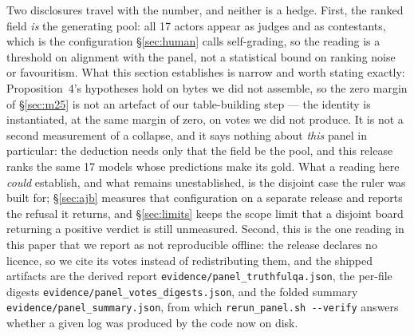 \documentclass{article}
\newcommand{\ids}[1]{\texttt{\small #1}} %
\begin{document}
Two disclosures travel with the number, and neither is a hedge. First, the ranked field \emph{is} the
generating pool: all 17 actors appear as judges and as contestants, which is the configuration \S\ref{sec:human}
calls self-grading, so the reading is a threshold on alignment with the panel, not a statistical bound on ranking noise or favouritism.
What this section establishes is narrow and worth stating exactly: Proposition~4's hypotheses hold on bytes we
did not assemble, so the zero margin of \S\ref{sec:m25} is not an artefact of our table-building step --- the
identity is instantiated, at the same margin of zero, on votes we did not produce. It is not a second
measurement of a collapse, and it says nothing about \emph{this} panel in particular: the deduction needs only
that the field be the pool, and this release ranks the same 17 models whose predictions make its gold. What a
reading here \emph{could} establish, and what remains unestablished, is the disjoint case the ruler was built
for; \S\ref{sec:ajb} measures that configuration on a separate release and reports the refusal it returns, and
\S\ref{sec:limits} keeps the scope limit that a disjoint board returning a positive verdict is still unmeasured. Second, this is the one reading in this paper that we report as not reproducible offline: the
release declares no licence, so we cite its votes instead of redistributing them, and the shipped artifacts
are the derived report \ids{evidence/panel\_truthfulqa.json}, the per-file digests
\ids{evidence/panel\_votes\_digests.json}, and the folded summary \ids{evidence/panel\_summary.json}, from
which \ids{rerun\_panel.sh -{}-verify} answers whether a given log was produced by the code now on disk.
\end{document}
